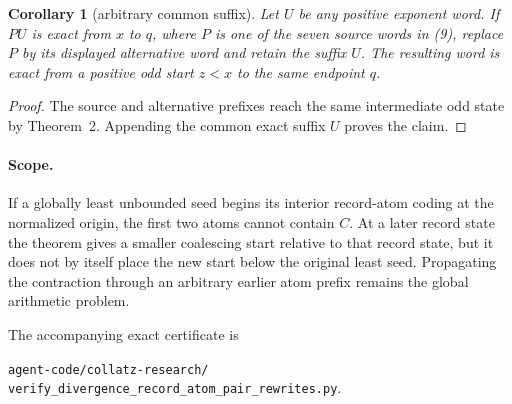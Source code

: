 \documentclass[11pt]{article}
\newtheorem{corollary}[theorem]{Corollary}
\begin{document}
\begin{corollary}[arbitrary common suffix]
Let $U$ be any positive exponent word.  If $PU$ is exact from $x$ to
$q$, where $P$ is one of the seven source words in (9), replace $P$ by
its displayed alternative word and retain the suffix $U$.  The resulting
word is exact from a positive odd start $z<x$ to the same endpoint $q$.
\end{corollary}

\begin{proof}
The source and alternative prefixes reach the same intermediate odd
state by Theorem~2.  Appending the common exact suffix $U$ proves the
claim.
\end{proof}

\paragraph{Scope.}
If a globally least unbounded seed begins its interior record-atom coding
at the normalized origin, the first two atoms cannot contain $C$.  At a
later record state the theorem gives a smaller coalescing start relative
to that record state, but it does not by itself place the new start below
the original least seed.  Propagating the contraction through an arbitrary
earlier atom prefix remains the global arithmetic problem.

The accompanying exact certificate is
\begin{center}
 \texttt{agent-code/collatz-research/}\\
 \texttt{verify\_divergence\_record\_atom\_pair\_rewrites.py}.
\end{center}
\end{document}
